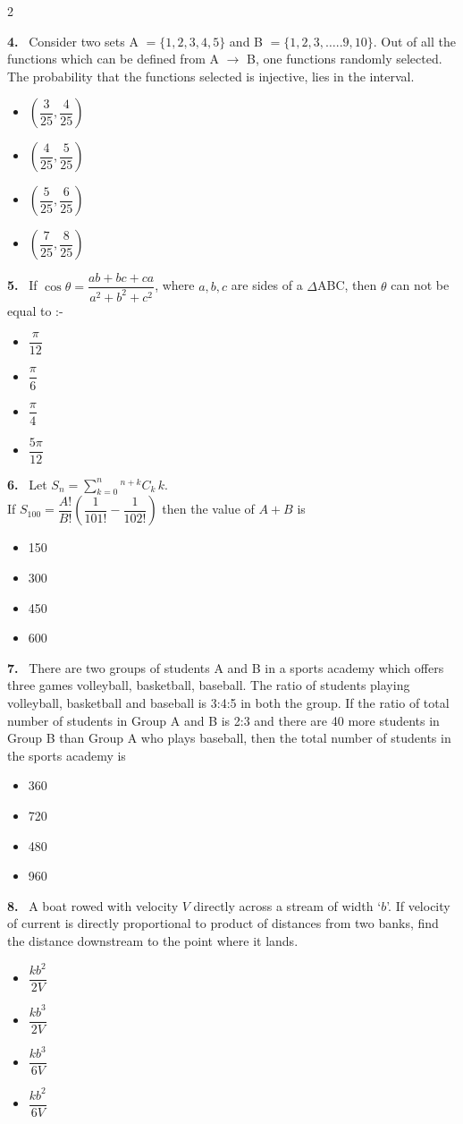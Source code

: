 \documentclass[10pt]{extarticle}
\newcommand{\qn}[1]{\par\smallskip\noindent\textbf{#1.}~}
\newenvironment{qoptions}{\begin{itemize}[leftmargin=1.8em,itemsep=1pt,topsep=2pt,label={}]}{\end{itemize}}
\newcommand{\opt}[2]{\item[(#1)] #2}
\begin{document}
\begin{multicols}{2}
\qn{4} Consider two sets A $=\{1,2,3,4,5\}$ and B $=\{1,2,3,\dots..9,10\}$. Out of all the functions which can be defined from A $\to$ B, one functions randomly selected. The probability that the functions selected is injective, lies in the interval.
\begin{qoptions}
\opt{A}{$\left(\dfrac3{25},\dfrac4{25}\right)$}
\opt{B}{$\left(\dfrac4{25},\dfrac5{25}\right)$}
\opt{C}{$\left(\dfrac5{25},\dfrac6{25}\right)$}
\opt{D}{$\left(\dfrac7{25},\dfrac8{25}\right)$}
\end{qoptions}

\qn{5} If $\cos\theta=\dfrac{ab+bc+ca}{a^2+b^2+c^2}$, where $a,b,c$ are sides of a $\Delta$ABC, then $\theta$ can not be equal to :-
\begin{qoptions}
\opt{A}{$\dfrac\pi{12}$}
\opt{B}{$\dfrac\pi6$}
\opt{C}{$\dfrac\pi4$}
\opt{D}{$\dfrac{5\pi}{12}$}
\end{qoptions}

\qn{6} Let $S_n=\displaystyle\sum_{k=0}^n{}^{n+k}C_k\,k$.\\
If $S_{100}=\dfrac{A!}{B!}\left(\dfrac1{101!}-\dfrac1{102!}\right)$ then the value of $A+B$ is
\begin{qoptions}
\opt{A}{150}
\opt{B}{300}
\opt{C}{450}
\opt{D}{600}
\end{qoptions}

\qn{7} There are two groups of students A and B in a sports academy which offers three games volleyball, basketball, baseball. The ratio of students playing volleyball, basketball and baseball is 3:4:5 in both the group. If the ratio of total number of students in Group A and B is 2:3 and there are 40 more students in Group B than Group A who plays baseball, then the total number of students in the sports academy is
\begin{qoptions}
\opt{A}{360}
\opt{B}{720}
\opt{C}{480}
\opt{D}{960}
\end{qoptions}

\qn{8} A boat rowed with velocity $V$ directly across a stream of width `$b$'. If velocity of current is directly proportional to product of distances from two banks, find the distance downstream to the point where it lands.
\begin{qoptions}
\opt{A}{$\dfrac{kb^2}{2V}$}
\opt{B}{$\dfrac{kb^3}{2V}$}
\opt{C}{$\dfrac{kb^3}{6V}$}
\opt{D}{$\dfrac{kb^2}{6V}$}
\end{qoptions}


\end{multicols}
\end{document}
